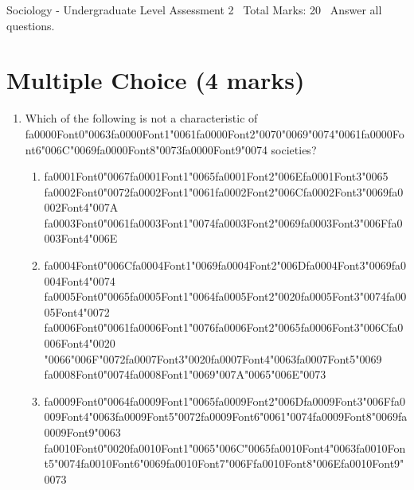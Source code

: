 \documentclass[12pt]{article}
\begin{document}
\begin{center}
Sociology - Undergraduate Level Assessment 2 \
Total Marks: 20 \
Answer all questions.
\end{center}

\section*{Multiple Choice (4 marks)}
\begin{enumerate}[label=\arabic*.]
\item Which of the following is not a characteristic of {\csname fa0000Font0\endcsname\char"0063}{\csname fa0000Font1\endcsname\char"0061}{\csname fa0000Font2\endcsname\char"0070}{\char"0069}{\char"0074}{\char"0061}{\csname fa0000Font6\endcsname\char"006C}{\char"0069}{\csname fa0000Font8\endcsname\char"0073}{\csname fa0000Font9\endcsname\char"0074} societies?
\begin{enumerate}[label=(\alph*)]
    \item {\csname fa0001Font0\endcsname\char"0067}{\csname fa0001Font1\endcsname\char"0065}{\csname fa0001Font2\endcsname\char"006E}{\csname fa0001Font3\endcsname\char"0065} {\csname fa0002Font0\endcsname\char"0072}{\csname fa0002Font1\endcsname\char"0061}{\csname fa0002Font2\endcsname\char"006C}{\csname fa0002Font3\endcsname\char"0069}{\csname fa0002Font4\endcsname\char"007A} {\csname fa0003Font0\endcsname\char"0061}{\csname fa0003Font1\endcsname\char"0074}{\csname fa0003Font2\endcsname\char"0069}{\csname fa0003Font3\endcsname\char"006F}{\csname fa0003Font4\endcsname\char"006E}
    \item {\csname fa0004Font0\endcsname\char"006C}{\csname fa0004Font1\endcsname\char"0069}{\csname fa0004Font2\endcsname\char"006D}{\csname fa0004Font3\endcsname\char"0069}{\csname fa0004Font4\endcsname\char"0074} {\csname fa0005Font0\endcsname\char"0065}{\csname fa0005Font1\endcsname\char"0064}{\csname fa0005Font2\endcsname\char"0020}{\csname fa0005Font3\endcsname\char"0074}{\csname fa0005Font4\endcsname\char"0072} {\csname fa0006Font0\endcsname\char"0061}{\csname fa0006Font1\endcsname\char"0076}{\csname fa0006Font2\endcsname\char"0065}{\csname fa0006Font3\endcsname\char"006C}{\csname fa0006Font4\endcsname\char"0020} {\char"0066}{\char"006F}{\char"0072}{\csname fa0007Font3\endcsname\char"0020}{\csname fa0007Font4\endcsname\char"0063}{\csname fa0007Font5\endcsname\char"0069} {\csname fa0008Font0\endcsname\char"0074}{\csname fa0008Font1\endcsname\char"0069}{\char"007A}{\char"0065}{\char"006E}{\char"0073}
    \item {\csname fa0009Font0\endcsname\char"0064}{\csname fa0009Font1\endcsname\char"0065}{\csname fa0009Font2\endcsname\char"006D}{\csname fa0009Font3\endcsname\char"006F}{\csname fa0009Font4\endcsname\char"0063}{\csname fa0009Font5\endcsname\char"0072}{\csname fa0009Font6\endcsname\char"0061}{\char"0074}{\csname fa0009Font8\endcsname\char"0069}{\csname fa0009Font9\endcsname\char"0063} {\csname fa0010Font0\endcsname\char"0020}{\csname fa0010Font1\endcsname\char"0065}{\char"006C}{\char"0065}{\csname fa0010Font4\endcsname\char"0063}{\csname fa0010Font5\endcsname\char"0074}{\csname fa0010Font6\endcsname\char"0069}{\csname fa0010Font7\endcsname\char"006F}{\csname fa0010Font8\endcsname\char"006E}{\csname fa0010Font9\endcsname\char"0073}

\end{enumerate}
\end{enumerate}
\end{document}
